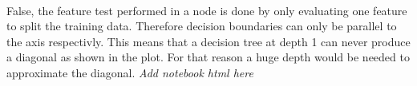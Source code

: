 

\newcommand{\ExerciseNumber}{01}

\newcommand{\PersonOne}{Marcel Bruckner (03674122)}
\newcommand{\PersonTwo}{Julian Hohenadel (03673879)}
\newcommand{\PersonThree}{Kevin Bein (03707775)}






%
%
%
%
%
%
%
\\
False, the feature test performed in a node is done by only evaluating one feature to split the training data. Therefore decision boundaries can only be parallel to the axis respectivly. This means that a decision tree at depth 1 can never produce a diagonal as shown in the plot. For that reason a huge depth would be needed to approximate the diagonal.
%
%
%
%
%
%
\textit{Add notebook html here}




